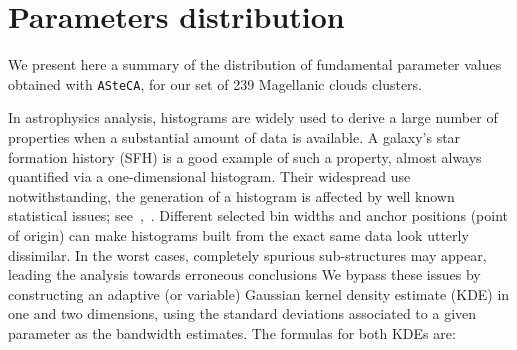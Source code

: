 \documentclass[a4paper,fleqn,usenatbib]{mnras}
\begin{document}

\section{Parameters distribution}
\label{sec:param-dist}

We present here a summary of the distribution of fundamental parameter values
obtained with \texttt{ASteCA}, for our set of 239 Magellanic clouds clusters.
%


In astrophysics analysis, histograms are widely used to derive a large number of
properties when a substantial amount of data is available. A galaxy's star
formation history (SFH) is a good example of such a property, almost always
quantified via a one-dimensional histogram.
%
Their widespread use notwithstanding, the generation of a histogram is affected
by well known statistical issues;
see~\cite{Silverman_1986},~\cite{Simonoff_1997}. Different selected bin widths
and anchor positions (point of origin) can make histograms built
from the exact same data look utterly dissimilar. In the worst cases, completely
spurious sub-structures may appear, leading the analysis towards erroneous
conclusions
%
We bypass these issues by constructing an adaptive (or variable) Gaussian kernel
density estimate (KDE) in one and two dimensions, using the standard deviations
associated to a given parameter as the bandwidth estimates. The formulas for
both KDEs are:
\end{document}
